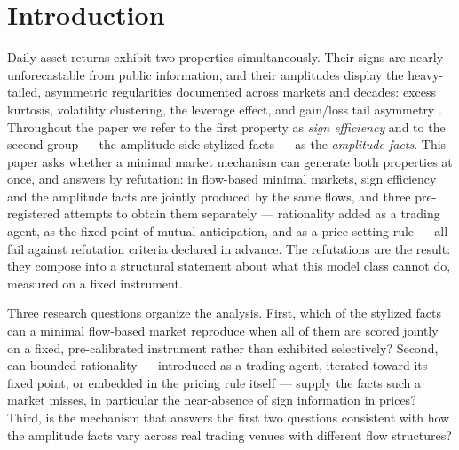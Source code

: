 \documentclass[11pt]{article}
\begin{document}
\section{Introduction}
\label{sec:intro}

Daily asset returns exhibit two properties simultaneously. Their signs are
nearly unforecastable from public information, and their amplitudes display
the heavy-tailed, asymmetric regularities documented across markets and
decades: excess kurtosis, volatility clustering, the leverage effect, and
gain/loss tail asymmetry \citep{cont2001}. Throughout the paper we refer to
the first property as \emph{sign efficiency} and to the second group ---
the amplitude-side stylized facts --- as the \emph{amplitude facts}. This
paper asks whether a minimal market mechanism can generate both properties
at once, and answers by refutation: in flow-based minimal markets, sign
efficiency and the amplitude facts are jointly produced by the same flows,
and three pre-registered attempts to obtain them separately --- rationality
added as a trading agent, as the fixed point of mutual anticipation, and as
a price-setting rule --- all fail against refutation criteria declared in
advance. The refutations are the result: they compose into a structural
statement about what this model class cannot do, measured on a fixed
instrument.

Three research questions organize the analysis. First, which of the
stylized facts can a minimal flow-based market reproduce when all of them
are scored jointly on a fixed, pre-calibrated instrument rather than
exhibited selectively? Second, can bounded rationality --- introduced as a
trading agent, iterated toward its fixed point, or embedded in the pricing
rule itself --- supply the facts such a market misses, in particular the
near-absence of sign information in prices? Third, is the mechanism that
answers the first two questions consistent with how the amplitude facts
vary across real trading venues with different flow structures?
\end{document}
